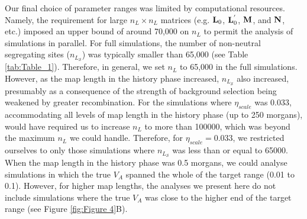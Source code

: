 \documentclass[12pt]{article}
\begin{document}
\begin{bibunit}
Our final choice of parameter ranges was limited by computational resources. Namely, the requirement for large $n_L \times n_L$ matrices (e.g. ${\bf L}_0$, ${\bf L}^{'}_0$, $\bf M$, and $\bf N$, etc.) imposed an upper bound of around 70,000 on $n_L$ to permit the analysis of simulations in parallel. For full simulations, the number of non-neutral segregating sites ($n_{L_\mathcal{S}}$) was typically smaller than 65,000 (see Table \ref{tab:Table_1}). Therefore, in general, we set $n_L$ to 65,000 in the full simulations. However, as the map length in the history phase increased, $n_{L_\mathcal{S}}$ also increased, presumably as a consequence of the strength of background selection being weakened by greater recombination. For the simulations where $\eta_{scale}$ was 0.033, accommodating all levels of map length in the history phase (up to 250 morgans), would have required us to increase $n_L$ to more than 100000, which was beyond the maximum $n_L$ we could handle. Therefore, for $\eta_{scale} = 0.033$, we restricted ourselves to only those simulations where $n_{L_\mathcal{S}}$ was less than or equal to 65000. When the map length in the history phase was 0.5 morgans, we could analyse simulations in which the true $V_A$ spanned the whole of the target range (0.01 to 0.1). However, for higher map lengths, the analyses we present here do not include simulations where the true $V_A$ was close to the higher end of the target range (see Figure \ref{fig:Figure 4}B).   


\end{bibunit}
\end{document}
